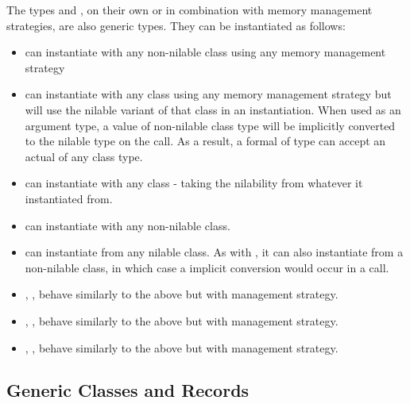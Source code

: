 The types  and , on their own or
in combination with memory management strategies, are also
generic types. They can be instantiated as follows:

\begin{itemize}
\item
{} can instantiate with any non-nilable class using any
memory management strategy

\item
{} can instantiate with any class using any memory management
strategy but will use the nilable variant of that class in an
instantiation. When used as an argument type, a value of non-nilable class
type will be implicitly converted to the nilable type on the call. As a
result, a formal of type  can accept an actual of any
class type.

\item
{} can instantiate with any  class - taking the
nilability from whatever it instantiated from.

\item
{} can instantiate with any non-nilable  class.

\item
{} can instantiate from any nilable 
class. As with , it can also instantiate from a
non-nilable  class, in which case a implicit conversion
would occur in a call.

\item
{}, ,  behave similarly
to the above but with  management strategy.

\item
{}, ,  behave similarly
to the above but with  management strategy.

\item
{}, ,  behave similarly
to the above but with  management strategy.

\end{itemize}


\subsection{Generic Classes and Records}

